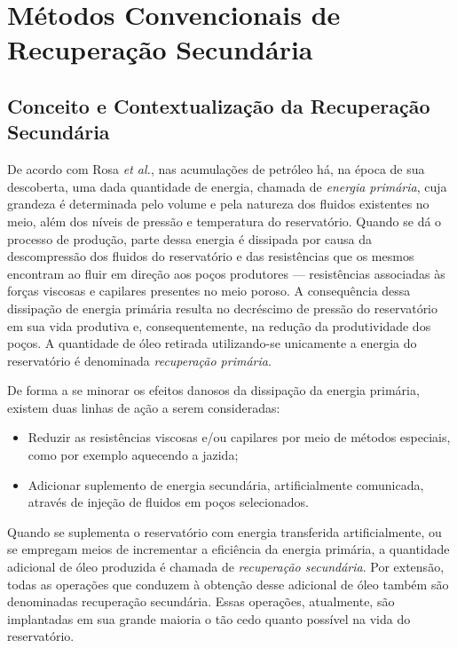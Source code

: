 
\section{Métodos Convencionais de Recuperação Secundária}

\subsection{Conceito e Contextualização da Recuperação Secundária}

De acordo com Rosa \textit{et al.}, nas acumulações de petróleo há, na época de sua descoberta, uma dada quantidade de energia, chamada de \textit{energia primária}, cuja grandeza é determinada pelo volume e pela natureza dos fluidos existentes no meio, além dos níveis de pressão e temperatura do reservatório. Quando se dá o processo de produção, parte dessa energia é dissipada por causa da descompressão dos fluidos do reservatório e das resistências que os mesmos encontram ao fluir em direção aos poços produtores --- resistências associadas às forças viscosas e capilares presentes no meio poroso. A consequência dessa dissipação de energia primária resulta no decréscimo de pressão do reservatório em sua vida produtiva e, consequentemente, na redução da produtividade dos poços. A quantidade de óleo retirada utilizando-se unicamente a energia do reservatório é denominada \textit{recuperação primária}.

De forma a se minorar os efeitos danosos da dissipação da energia primária, existem duas linhas de ação a serem consideradas:

\begin{itemize}
\item Reduzir as resistências viscosas e/ou capilares por meio de métodos especiais, como por exemplo aquecendo a jazida;
\item Adicionar suplemento de energia secundária, artificialmente comunicada, através de injeção de fluidos em poços selecionados.
\end{itemize}

Quando se suplementa o reservatório com energia transferida artificialmente, ou se empregam meios de incrementar a eficiência da energia primária, a quantidade adicional de óleo produzida é chamada de \textit{recuperação secundária}. Por extensão, todas as operações que conduzem à obtenção desse adicional de óleo também são denominadas recuperação secundária. Essas operações, atualmente, são implantadas em sua grande maioria o tão cedo quanto possível na vida do reservatório.

